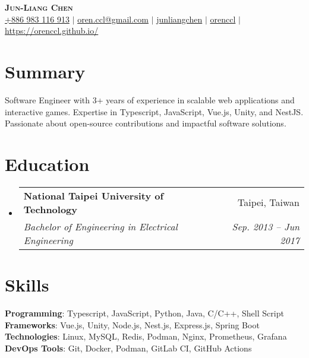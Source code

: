 \documentclass[letterpaper,11pt]{article}
\makeatletter
\newcommand{\resumeSubheading}[4]{
  \vspace{-2pt}\item
    \begin{tabular*}{0.97\textwidth}[t]{l@{\extracolsep{\fill}}r}
      \textbf{#1} & #2 \\
      \textit{\small#3} & \textit{\small #4} \\
    \end{tabular*}\vspace{-3pt}
}
\newcommand{\resumeSubHeadingListStart}{\begin{itemize}[leftmargin=0.15in, label={}]}
\newcommand{\resumeSubHeadingListEnd}{\end{itemize}}
\makeatother
\begin{document}

\begin{center}
    \textbf{\Huge \scshape Jun-Liang Chen} \\ \vspace{1pt}
     \href{tel:886983116913}{{+886 983 116 913}} $|$
     \href{mailto:oren.ccl@gmail.com}{{oren.ccl@gmail.com}} $|$
     \href{https://www.linkedin.com/in/jun-liang-chen-6a7743188/}{{junliangchen}} $|$
     \href{https://github.com/orenccl}{{orenccl}} $|$
     \href{https://orenccl.github.io/}{{https://orenccl.github.io/}}
\end{center}

\section{Summary}
\small{Software Engineer with 3+ years of experience in scalable web applications and interactive games. Expertise in Typescript, JavaScript, Vue.js, Unity, and NestJS. Passionate about open-source contributions and impactful software solutions.}

\section{Education}
  \resumeSubHeadingListStart
    \resumeSubheading
      {National Taipei University of Technology}{Taipei, Taiwan}
      {Bachelor of Engineering in Electrical Engineering}{Sep. 2013 -- Jun 2017}
  \resumeSubHeadingListEnd

\section{Skills}
 \begin{itemize}[leftmargin=0.15in, label={}]
    \small{\item{
     \textbf{Programming}{: Typescript, JavaScript, Python, Java, C/C++, Shell Script} \\
     \textbf{Frameworks}{: Vue.js, Unity, Node.js, Nest.js, Express.js, Spring Boot} \\
     \textbf{Technologies}{: Linux, MySQL, Redis, Podman, Nginx, Prometheus, Grafana} \\
      \textbf{DevOps Tools}{: Git, Docker, Podman, GitLab CI, GitHub Actions} \\
    }}
 \end{itemize}
\end{document}
